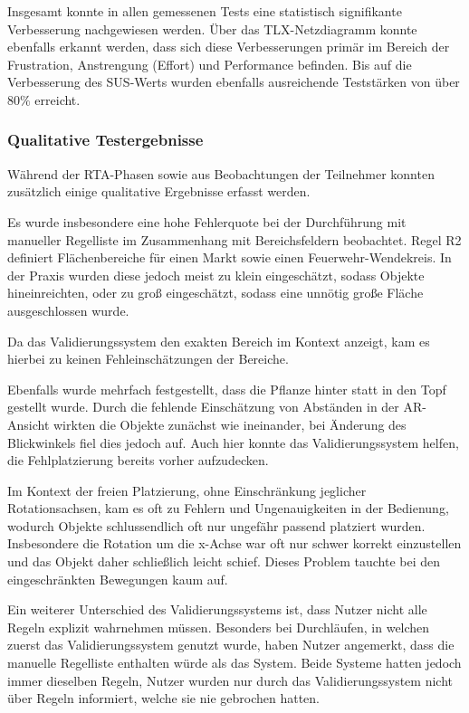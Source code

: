 \medskip

Insgesamt konnte in allen gemessenen Tests eine statistisch signifikante Verbesserung nachgewiesen werden. Über das TLX-Netzdiagramm konnte ebenfalls erkannt werden, dass sich diese Verbesserungen primär im Bereich der Frustration, Anstrengung (Effort) und Performance befinden. Bis auf die Verbesserung des SUS-Werts wurden ebenfalls ausreichende Teststärken von über $80\%$ erreicht.

\subsubsection{Qualitative Testergebnisse}

Während der RTA-Phasen sowie aus Beobachtungen der Teilnehmer konnten zusätzlich einige qualitative Ergebnisse erfasst werden.

Es wurde insbesondere eine hohe Fehlerquote bei der Durchführung mit manueller Regelliste im Zusammenhang mit Bereichsfeldern beobachtet. Regel R2 definiert Flächenbereiche für einen Markt sowie einen Feuerwehr-Wendekreis. In der Praxis wurden diese jedoch meist zu klein eingeschätzt, sodass Objekte hineinreichten, oder zu groß eingeschätzt, sodass eine unnötig große Fläche ausgeschlossen wurde.

Da das Validierungssystem den exakten Bereich im Kontext anzeigt, kam es hierbei zu keinen Fehleinschätzungen der Bereiche.

\medskip

Ebenfalls wurde mehrfach festgestellt, dass die Pflanze hinter statt in den Topf gestellt wurde. Durch die fehlende Einschätzung von Abständen in der AR-Ansicht wirkten die Objekte zunächst wie ineinander, bei Änderung des Blickwinkels fiel dies jedoch auf. Auch hier konnte das Validierungssystem helfen, die Fehlplatzierung bereits vorher aufzudecken.

\medskip

Im Kontext der freien Platzierung, ohne Einschränkung jeglicher Rotationsachsen, kam es oft zu Fehlern und Ungenauigkeiten in der Bedienung, wodurch Objekte schlussendlich oft nur ungefähr passend platziert wurden. Insbesondere die Rotation um die x-Achse war oft nur schwer korrekt einzustellen und das Objekt daher schließlich leicht schief. Dieses Problem tauchte bei den eingeschränkten Bewegungen kaum auf.

\medskip

Ein weiterer Unterschied des Validierungssystems ist, dass Nutzer nicht alle Regeln explizit wahrnehmen müssen. Besonders bei Durchläufen, in welchen zuerst das Validierungssystem genutzt wurde, haben Nutzer angemerkt, dass die manuelle Regelliste  enthalten würde als das System. Beide Systeme hatten jedoch immer dieselben Regeln, Nutzer wurden nur durch das Validierungssystem nicht über Regeln informiert, welche sie nie gebrochen hatten.

